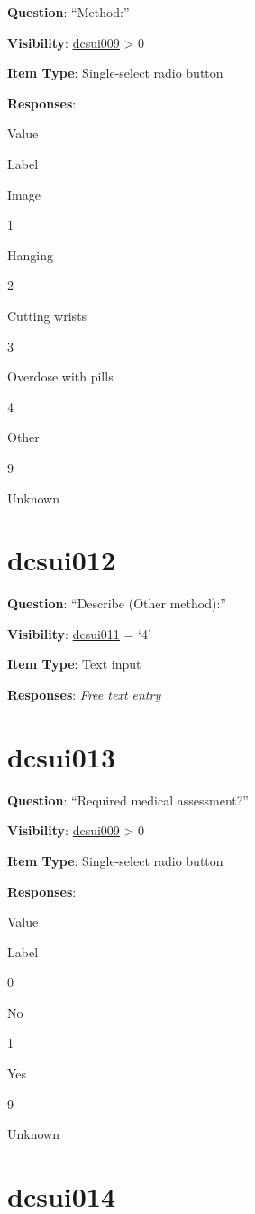 \documentclass[]{book}
\begin{document}
\textbf{Question}: ``Method:''

\textbf{Visibility}: \protect\hyperlink{dcsui009}{dcsui009} \textgreater{} 0

\textbf{Item Type}: Single-select radio button

\textbf{Responses}:

Value

Label

Image

1

Hanging

2

Cutting wrists

3

Overdose with pills

4

Other

9

Unknown

\hypertarget{dcsui012}{%
\section{dcsui012}\label{dcsui012}}

\textbf{Question}: ``Describe (Other method):''

\textbf{Visibility}: \protect\hyperlink{dcsui011}{dcsui011} = `4'

\textbf{Item Type}: Text input

\textbf{Responses}: \emph{Free text entry}

\hypertarget{dcsui013}{%
\section{dcsui013}\label{dcsui013}}

\textbf{Question}: ``Required medical assessment?''

\textbf{Visibility}: \protect\hyperlink{dcsui009}{dcsui009} \textgreater{} 0

\textbf{Item Type}: Single-select radio button

\textbf{Responses}:

Value

Label

0

No

1

Yes

9

Unknown

\hypertarget{dcsui014}{%
\section{dcsui014}\label{dcsui014}}
\end{document}
